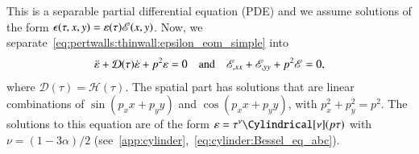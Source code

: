 This is a separable partial differential equation (PDE) and we assume solutions of the form $\epsilon(\tau, x, y) = \varepsilon(\tau)\mathscr{E}(x,y)$. Now, we separate~\cref{eq:pertwalls:thinwall:epsilon_eom_simple} into
\begin{align}\label{eq:pertwalls:thinwall:varepsilon_and_E_eoms}
    \ddot{\varepsilon} + \mathcal{D}(\tau) \dot{\varepsilon} + p^2 \varepsilon = 0 \quad\text{and}\quad  \mathscr{E}_{,xx} + \mathscr{E}_{,yy} + p^2 \mathscr{E} = 0,
\end{align}
where $\mathcal{D}(\tau) = \mathcal{H}(\tau)$. %
The spatial part has solutions that are linear combinations of $\sin{(p_x x+p_y y)}$ and $\cos{(p_x x+p_y y)}$, with $p_x^2+p_y^2 = p^2$. %
The solutions to this equation are of the form $\varepsilon = \tau^\nu \Cylindrical[\nu](p\tau)$ with $ \nu=(1-3\alpha)/2$ (see~\cref{app:cylinder},~\cref{eq:cylinder:Bessel_eq_abc}).






























